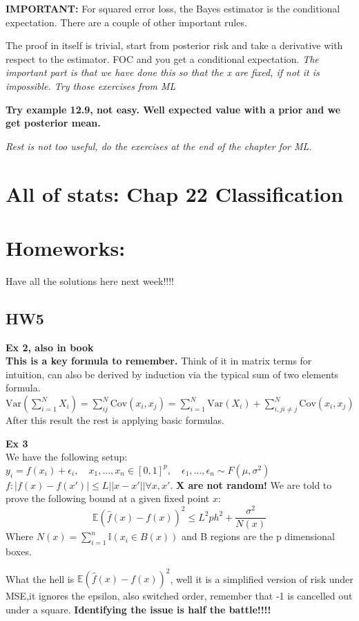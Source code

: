 \documentclass{article}
\begin{document}
\textbf{IMPORTANT:} For squared error loss, the Bayes estimator is the conditional expectation.
There are a couple of other important rules.

The proof in itself is trivial, start from posterior risk and take a derivative with respect to the estimator.
FOC and you get a conditional expectation. \textit{The important part is that we have done this so that the x are fixed, if not it is impossible. Try those exercises from ML}

\textbf{Try example 12.9, not easy. Well expected value with a prior and we get posterior mean.}

\textit{Rest is not too useful, do the exercises at the end of the chapter for ML.}

\section{All of stats: Chap 22 Classification}

\section*{Homeworks:}
Have all the solutions here next week!!!!
\subsection*{HW5}
\textbf{Ex 2, also in book}\\
\textbf{This is a key formula to remember.} Think of it in matrix terms for intuition, can also be 
derived by induction via the typical sum of two elements formula.
\noindent
$\text{Var}(\sum_{i=1}^{N}X_i) = \sum_{ij}^{N} \text{Cov}(x_i, x_j) = \sum_{i=1}^{N}\text{Var}(X_i) + \sum_{i,j i\neq j}^{N}\text{Cov}(x_i,x_j)$
After this result the rest is applying basic formulas. 

\textbf{Ex 3}\\
We have the following setup: $y_i = f(x_i) + \epsilon_i, \quad x_1,...,x_n \in [0,1]^p, \quad \epsilon_1,...,\epsilon_n \sim F(\mu,\sigma^2)$ 
$f : |f(x) - f(x')| \leq L||x- x'|| \forall x,x'$. 
\textbf{X are not random!}
We are told to prove the following bound at a given fixed point $x$: 
$$\mathbb{E}(\hat{f}(x)-f(x))^2 \leq L^2ph^2 + \frac{\sigma^2}{N(x)} $$
Where $N(x) = \sum_{i=1}^{n}\mathbb{I}(x_i \in B(x))$ and B regions are the p dimensional boxes. 

What the hell is $\mathbb{E}(\hat{f}(x)-f(x))^2$, well it is a simplified version of risk under MSE,it ignores the epsilon, also switched order, remember that -1 is cancelled out 
under a square. \textbf{Identifying the issue is half the battle!!!!} 
\end{document}
